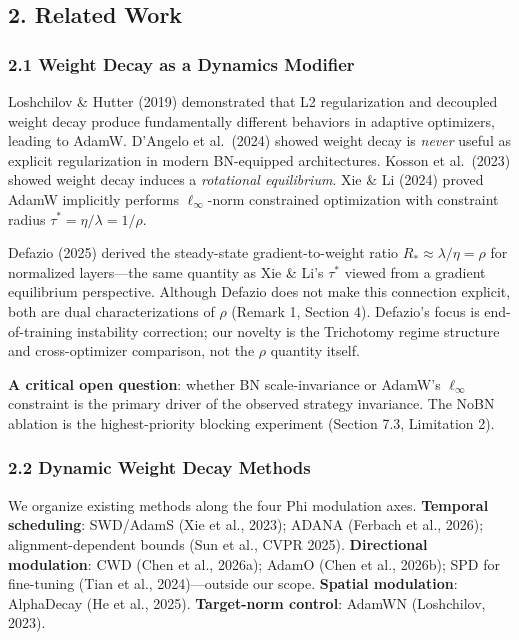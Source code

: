 \documentclass[
]{article}
\begin{document}
\hypertarget{related-work}{%
\subsection{2. Related Work}\label{related-work}}

\hypertarget{weight-decay-as-a-dynamics-modifier}{%
\subsubsection{2.1 Weight Decay as a Dynamics
Modifier}\label{weight-decay-as-a-dynamics-modifier}}

Loshchilov \& Hutter (2019) demonstrated that L2 regularization and
decoupled weight decay produce fundamentally different behaviors in
adaptive optimizers, leading to AdamW. D'Angelo et al.~(2024) showed
weight decay is \emph{never} useful as explicit regularization in modern
BN-equipped architectures. Kosson et al.~(2023) showed weight decay
induces a \emph{rotational equilibrium}. Xie \& Li (2024) proved AdamW
implicitly performs \(\ell_\infty\)-norm constrained optimization with
constraint radius \(\tau^* = \eta/\lambda = 1/\rho\).

Defazio (2025) derived the steady-state gradient-to-weight ratio
\(R_* \approx \lambda/\eta = \rho\) for normalized layers---the same
quantity as Xie \& Li's \(\tau^*\) viewed from a gradient equilibrium
perspective. Although Defazio does not make this connection explicit,
both are dual characterizations of \(\rho\) (Remark 1, Section 4).
Defazio's focus is end-of-training instability correction; our novelty
is the Trichotomy regime structure and cross-optimizer comparison, not
the \(\rho\) quantity itself.

\textbf{A critical open question}: whether BN scale-invariance or
AdamW's \(\ell_\infty\) constraint is the primary driver of the observed
strategy invariance. The NoBN ablation is the highest-priority blocking
experiment (Section 7.3, Limitation 2).

\hypertarget{dynamic-weight-decay-methods}{%
\subsubsection{2.2 Dynamic Weight Decay
Methods}\label{dynamic-weight-decay-methods}}

We organize existing methods along the four Phi modulation axes.
\textbf{Temporal scheduling}: SWD/AdamS (Xie et al., 2023); ADANA
(Ferbach et al., 2026); alignment-dependent bounds (Sun et al., CVPR
2025). \textbf{Directional modulation}: CWD (Chen et al., 2026a); AdamO
(Chen et al., 2026b); SPD for fine-tuning (Tian et al., 2024)---outside
our scope. \textbf{Spatial modulation}: AlphaDecay (He et al., 2025).
\textbf{Target-norm control}: AdamWN (Loshchilov, 2023).
\end{document}
